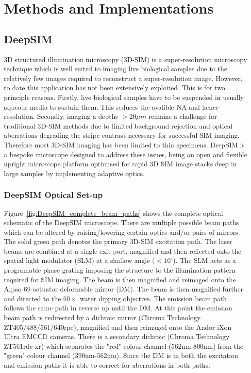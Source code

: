 \chapter{Methods and Implementations}

\section{DeepSIM}
\label{sec:DeepSIM}

3D structured illumination microscopy (3D-SIM) is a super-resolution microscopy technique which is well suited to imaging live biological samples due to the relatively few images required to reconstruct a super-resolution image. However, to date this application has not been extensively exploited. This is for two principle reasons. Firstly, live biological samples have to be suspended in usually aqueous  media to sustain them. This reduces the avalible NA and hence resolution. Secondly, imaging a depths $>20\mu m$ remains a challenge for traditional 3D-SIM methods due to limited background rejection and optical aberrations degrading the stripe contrast necessary for successful SIM imaging.\cite{wu2018faster} Therefore most 3D-SIM imaging has been limited to thin specimens. DeepSIM is a bespoke microscope designed to address these issues, being an open and flexible upright microscope platform optimised for rapid 3D SIM image stacks deep in large samples by implementing adaptive optics. 


\subsection{DeepSIM Optical Set-up}
\label{subsec:DeepSIM_optics}

Figure~\ref{fig:DeepSIM_complete_beam_paths} shows the complete optical schematic of the DeepSIM microscope. There are multiple possible beam paths which can be altered by raising/lowering certain optics and/or pairs of mirrors. The solid green path denotes the primary 3D-SIM excitation path. The laser beams are combined at a single exit port, magnified and then reflected onto the spatial light modulator (SLM) at a shallow angle ($<10^{\circ}$). The SLM acts as a programable phase grating imposing the structure to the illumination pattern required for SIM imaging. The beam is then magnified and reimaged onto the Alpao 69-actuator deformable mirror (DM). The beam is then magnified further and directed to the $60\times$ water dipping objective. The emission beam path follows the same path in reverse up until the DM. At this point the emission beam path is redirected by a dichroic mirror (Chroma Technology ZT405/488/561/640rpc), magnified and then reimaged onto the Andor iXon Ultra EMCCD cameras. There is a secondary dichroic (Chroma Technology ZT561rdc-xr) which separates the "red" colour channel (562nm-800nm) from the "green" colour channel (390nm-562nm). Since the DM is in both the excitation and emission paths it is able to correct for aberrations in both paths.

